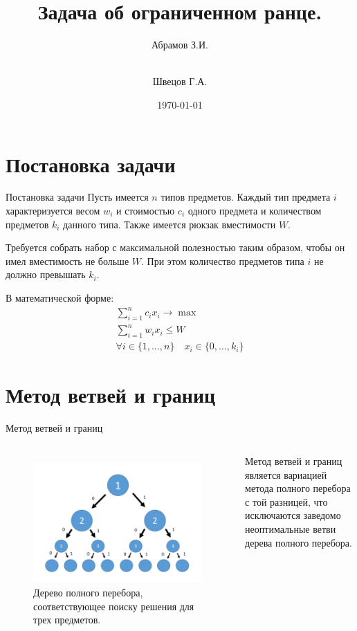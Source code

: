 \documentclass[ignoreonframetext,unicode]{beamer}
\institute[каф. Прикладная математика ФН-2]{группа ФН2-42Б}
\date{\today}
\title[Задача об ограниченном ранце]{Задача об ограниченном ранце.}
\author[Абрамов З.И., Швецов Г.A.]{Абрамов З.И.\and\\[0.5mm] Швецов Г.А.}
\begin{document}
	\begin{frame}[plain]
		\maketitle	\end{frame}
		\section{Постановка задачи}
	\begin{frame}{Постановка задачи}	
		\small
		Пусть имеется $n$ типов предметов. Каждый тип предмета $i$ характеризуется весом $w_i$ и стоимостью $c_i$ одного предмета и количеством предметов $k_i$ данного типа. Также имеется рюкзак вместимости $W$.
		
		Требуется собрать набор с максимальной полезностью таким образом, чтобы он имел вместимость не больше $W$. При этом количество предметов типа $i$ не должно превышать $k_i$.
		
		В математической форме:
		\begin{gather*}
			\sum_{i=1}^{n} c_i x_i \to \max \\
			\sum_{i=1}^{n} w_i x_i \leqslant W \\
			\forall i\in\{1,\dots,n\} \quad x_i \in \{0,\dots, k_i\}
		\end{gather*}
	\end{frame}
		\section{Метод ветвей и границ}
	\begin{frame}{Метод ветвей и границ}
		\begin{columns}
			\begin{figure}[H]
			\includegraphics[scale=0.2]{Дерево}
			\small
		Дерево полного перебора, соответствующее поиску решения для трех предметов.
		\end{figure}
	Метод ветвей и границ является вариацией метода полного перебора с той разницей, что исключаются заведомо неоптимальные ветви дерева полного перебора.
		\end{columns}
				\end{frame}
			
\end{document}

